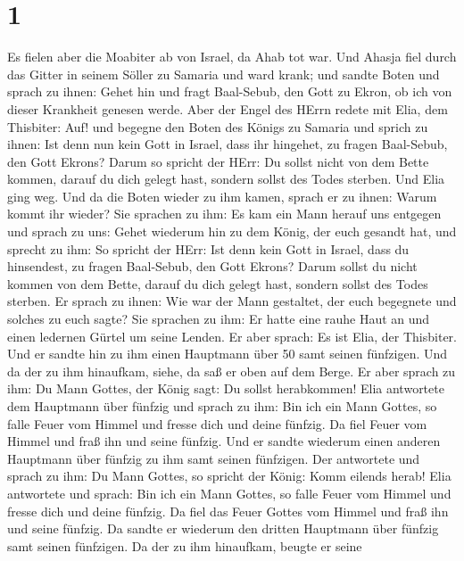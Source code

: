 \hypertarget{section}{%
\section{1}\label{section}}

 Es fielen aber die Moabiter ab von Israel, da Ahab tot war.
 Und Ahasja fiel durch das Gitter in seinem Söller zu
Samaria und ward krank; und sandte Boten und sprach zu ihnen: Gehet hin
und fragt Baal-Sebub, den Gott zu Ekron, ob ich von dieser Krankheit
genesen werde.  Aber der Engel des HErrn redete mit Elia,
dem Thisbiter: Auf! und begegne den Boten des Königs zu Samaria und
sprich zu ihnen: Ist denn nun kein Gott in Israel, dass ihr hingehet, zu
fragen Baal-Sebub, den Gott Ekrons?  Darum so spricht der
HErr: Du sollst nicht von dem Bette kommen, darauf du dich gelegt hast,
sondern sollst des Todes sterben. Und Elia ging weg.  Und da
die Boten wieder zu ihm kamen, sprach er zu ihnen: Warum kommt ihr
wieder?  Sie sprachen zu ihm: Es kam ein Mann herauf uns
entgegen und sprach zu uns: Gehet wiederum hin zu dem König, der euch
gesandt hat, und sprecht zu ihm: So spricht der HErr: Ist denn kein Gott
in Israel, dass du hinsendest, zu fragen Baal-Sebub, den Gott Ekrons?
Darum sollst du nicht kommen von dem Bette, darauf du dich gelegt hast,
sondern sollst des Todes sterben.  Er sprach zu ihnen: Wie
war der Mann gestaltet, der euch begegnete und solches zu euch sagte?
 Sie sprachen zu ihm: Er hatte eine rauhe Haut an und einen
ledernen Gürtel um seine Lenden. Er aber sprach: Es ist Elia, der
Thisbiter.  Und er sandte hin zu ihm einen Hauptmann über 50
samt seinen fünfzigen. Und da der zu ihm hinaufkam, siehe, da saß er
oben auf dem Berge. Er aber sprach zu ihm: Du Mann Gottes, der König
sagt: Du sollst herabkommen!  Elia antwortete dem Hauptmann
über fünfzig und sprach zu ihm: Bin ich ein Mann Gottes, so falle Feuer
vom Himmel und fresse dich und deine fünfzig. Da fiel Feuer vom Himmel
und fraß ihn und seine fünfzig.  Und er sandte wiederum
einen anderen Hauptmann über fünfzig zu ihm samt seinen fünfzigen. Der
antwortete und sprach zu ihm: Du Mann Gottes, so spricht der König: Komm
eilends herab!  Elia antwortete und sprach: Bin ich ein
Mann Gottes, so falle Feuer vom Himmel und fresse dich und deine
fünfzig. Da fiel das Feuer Gottes vom Himmel und fraß ihn und seine
fünfzig.  Da sandte er wiederum den dritten Hauptmann über
fünfzig samt seinen fünfzigen. Da der zu ihm hinaufkam, beugte er seine
